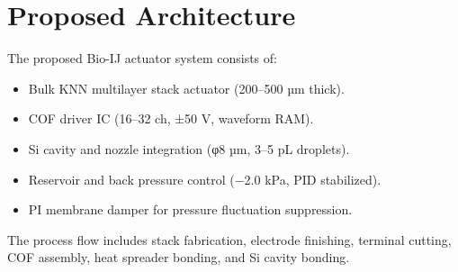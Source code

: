 \section{Proposed Architecture}
The proposed Bio-IJ actuator system consists of:
\begin{itemize}
  \item Bulk KNN multilayer stack actuator (200--500 µm thick).
  \item COF driver IC (16--32 ch, ±50 V, waveform RAM).
  \item Si cavity and nozzle integration (φ8 µm, 3--5 pL droplets).
  \item Reservoir and back pressure control (−2.0 kPa, PID stabilized).
  \item PI membrane damper for pressure fluctuation suppression.
\end{itemize}

The process flow includes stack fabrication, electrode finishing,
terminal cutting, COF assembly, heat spreader bonding, and Si cavity
bonding.
